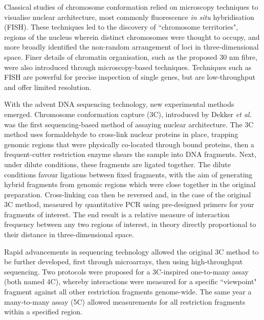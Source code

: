\documentclass[a4paper,11pt,oneside]{book}
\begin{document}
Classical studies of chromosome conformation relied on microscopy techniques to visualise nuclear architecture, most commonly fluorescence \emph{in situ} hybridisation (FISH). These techniques led to the discovery of ``chromosome territories", regions of the nucleus wherein distinct chromosomes were thought to occupy, and more broadly identified the non-random arrangement of loci in three-dimensional space.\cite{DeWit2012, VanSteensel2010} Finer details of chromatin organisation, such as the proposed 30 nm fibre, were also introduced through microscopy-based techniques. Techniques such as FISH are powerful for precise inspection of single genes, but are low-throughput and offer limited resolution.\cite{DeWit2012}

With the advent DNA sequencing technology, new experimental methods emerged. Chromosome conformation capture (3C), introduced by Dekker \emph{et al.}\cite{Dekker2002} was the first sequencing-based method of assaying nuclear architecture. The 3C method uses formaldehyde to cross-link nuclear proteins in place, trapping genomic regions that were physically co-located through bound proteins, then a frequent-cutter restriction enzyme shears the sample into DNA fragments. Next, under dilute conditions, these fragments are ligated together. The dilute conditions favour ligations between fixed fragments, with the aim of generating hybrid fragments from genomic regions which were close together in the original preparation. Cross-linking can then be reversed and, in the case of the original 3C method, measured by quantitative PCR using pre-designed primers for your fragments of interest. The end result is a relative measure of interaction frequency between any two regions of interest, in theory directly proportional to their distance in three-dimensional space.

Rapid advancements in sequencing technology allowed the original 3C method to be further developed, first through microarrays, then using high-throughput sequencing. Two protocols were proposed for a 3C-inspired one-to-many assay\cite{Zhao2006, Simonis2006} (both named 4C), whereby interactions were measured for a specific ``viewpoint" fragment against all other restriction fragments genome-wide. The same year a many-to-many assay (5C) allowed measurements for all restriction fragments within a specified region.\cite{Dostie2006} 
\end{document}
